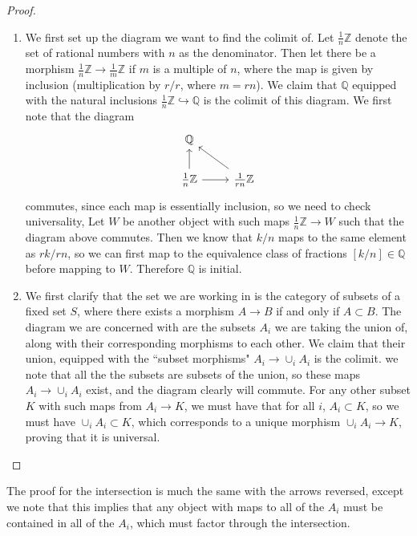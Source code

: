 \documentclass[psamsfonts]{amsart}
\theoremstyle{definition}
\theoremstyle{remark}
\newcommand{\Q}{\mathbb{Q}}
\newcommand{\Z}{\mathbb{Z}}
\begin{document}
\begin{proof}
\begin{enumerate}
\item We first set up the diagram we want to find the colimit of. Let $\frac{1}{n}\Z$ denote the set of rational numbers with $n$ as the denominator. Then let there be a morphism $\frac{1}{n}\Z \to \frac{1}{m}\Z$ if $m$ is a multiple of $n$, where the map is given by inclusion (multiplication by $r/r$, where $m = rn$). We claim that $\Q$ equipped with the natural inclusions $\frac{1}{n}\Z \hookrightarrow \Q$ is the colimit of this diagram. We first note that the diagram
$$\begin{tikzcd}
\Q \\
\frac{1}{n}\Z \arrow[r] \arrow[u] & \frac{1}{rn}\Z \arrow[ul]
\end{tikzcd}$$
commutes, since each map is essentially inclusion, so we need to check universality, Let $W$ be another object with such maps $\frac{1}{n}\Z \to W$ such that the diagram above commutes. Then we know that $k/n$ maps to the same element as $rk/rn$, so we can first map to the equivalence class of fractions $[k/n] \in \Q$ before mapping to $W$. Therefore $\Q$ is initial.
\item We first clarify that the set we are working in is the category of subsets of a fixed set $S$, where there exists a morphism $A \to B$ if and only if $A \subset B$. The diagram we are concerned with are the subsets $A_i$ we are taking the union of, along with their corresponding morphisms to each other. We claim that their union, equipped with the 	``subset morphisms" $A_i \to \cup_i A_i$ is the colimit. we note that all the the subsets are subsets of the union, so these maps $A_i \to \cup_i A_i$ exist, and the diagram clearly will commute. For any other subset $K$ with such maps from $A_i \to K$, we must have that for all $i$, $A_i \subset K$, so we must have $\cup_i A_i \subset K$, which corresponds to a unique morphism $\cup_i A_i \to K$, proving that it is universal.
\end{enumerate}
\end{proof}

The proof for the intersection is much the same with the arrows reversed, except we note that this implies that any object with maps to all of the $A_i$ must be contained in all of the $A_i$, which must factor through the intersection. 
\end{document}
